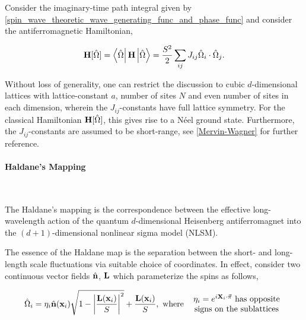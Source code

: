 Consider the imaginary-time path integral given by \cref{spin_wave_theoretic_wave_generating_func_and_phase_func} and consider the antiferromagnetic Hamiltonian, 

$$
    {\bf H}[\hat{\Omega}] = \bra{\hat{\Omega}} {{\bf H}} \ket{\hat{\Omega}} = \frac{S^2}{2} \sum_{ij} J_{ij} \hat{\Omega}_i \cdot \hat{\Omega}_j.
$$

Without loss of generality, one can restrict the discussion to cubic $d$-dimensional lattices with lattice-constant $a$, number of sites $N$ and even number of sites in each dimension, wherein the $J_{ij}$-constants have full lattice symmetry. For the classical Hamiltonian ${\bf H}[\hat{\Omega}]$, this gives rise to a Néel ground state. Furthermore, the $J_{ij}$-constants are assumed to be short-range, see \cref{Mervin-Wagner}
for further reference. \\

\paragraph{Haldane's Mapping}

\blanky \\

\begin{tcolorbox}[title = Physical Context, colback = yellow]

The Haldane's mapping is the correspondence between the effective long-wavelength action of the quantum $d$-dimensional Heisenberg antiferromagnet into the $(d+1)$-dimensional nonlinear sigma model (NLSM). 

\end{tcolorbox}

The essence of the Haldane map is the separation between the short- and long-length scale fluctuations via suitable choice of coordinates. In effect, consider two continuous vector fields $\hat{{\bf n}}$, ${\bf L}$ which parameterize the spins as follows,

\begin{equation}
    \hat{\Omega}_i = \eta_i \hat{{\bf n}}({\bf x}_i) \sqrt{1 - \bigg|\frac{{\bf L}({\bf x}_i)}{S}\bigg|^2} + \frac{{\bf L}({\bf x}_i)}{S}, \textnormal{ where } \begin{array}{cc}
         \textnormal{ $\eta_i = e^{i {\bf X}_i \cdot \vec{\pi}}$ has opposite}  \\
         \textnormal{ signs on the sublattices}
    \end{array}
    \label{NLSM_coordinate_transform}
\end{equation}

